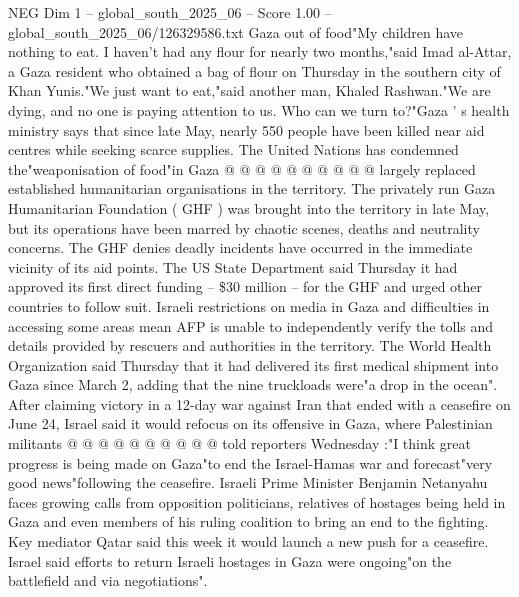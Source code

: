 \begin{textsample}{NEG Dim 1 – global\_south\_2025\_06 – Score 1.00 – global\_south\_2025\_06/126329586.txt}
Gaza out of food"My children have nothing to eat.
I haven't had any flour for nearly two months,"said Imad al-Attar, a Gaza resident who obtained a bag of flour on Thursday in the southern city of Khan Yunis."We just want to eat,"said another man, Khaled Rashwan."We are dying, and no one is paying attention to us.
Who can we turn to?"Gaza ' s health ministry says that since late May, nearly 550 people have been killed near aid centres while seeking scarce supplies.
The United Nations has condemned the"weaponisation of food"in Gaza @ @ @ @ @ @ @ @ @ @ largely replaced established humanitarian organisations in the territory.
The privately run Gaza Humanitarian Foundation ( GHF ) was brought into the territory in late May, but its operations have been marred by chaotic scenes, deaths and neutrality concerns.
The GHF denies deadly incidents have occurred in the immediate vicinity of its aid points.
The US State Department said Thursday it had approved its first direct funding -- \$30 million -- for the GHF and urged other countries to follow suit.
Israeli restrictions on media in Gaza and difficulties in accessing some areas mean AFP is unable to independently verify the tolls and details provided by rescuers and authorities in the territory.
The World Health Organization said Thursday that it had delivered its first medical shipment into Gaza since March 2, adding that the nine truckloads were"a drop in the ocean".
After claiming victory in a 12-day war against Iran that ended with a ceasefire on June 24, Israel said it would refocus on its offensive in Gaza, where Palestinian militants @ @ @ @ @ @ @ @ @ @ told reporters Wednesday :"I think great progress is being made on Gaza"to end the Israel-Hamas war and forecast"very good news"following the ceasefire.
Israeli Prime Minister Benjamin Netanyahu faces growing calls from opposition politicians, relatives of hostages being held in Gaza and even members of his ruling coalition to bring an end to the fighting.
Key mediator Qatar said this week it would launch a new push for a ceasefire.
Israel said efforts to return Israeli hostages in Gaza were ongoing"on the battlefield and via negotiations".

\end{textsample}
